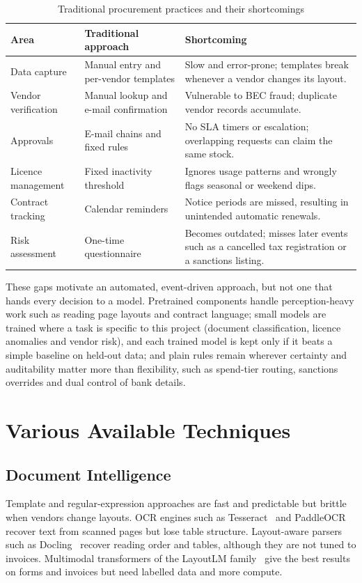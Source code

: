 \begin{table}[!htbp]
\centering\tablestyle
\caption{Traditional procurement practices and their shortcomings}\label{tab:traditional}
\begin{tabularx}{\textwidth}{|L{0.19\textwidth}|L{0.27\textwidth}|Y|}
\hline
\textbf{Area} & \textbf{Traditional approach} & \textbf{Shortcoming} \\ \hline
Data capture & Manual entry and per-vendor templates & Slow and error-prone; templates break whenever a vendor changes its layout. \\ \hline
Vendor verification & Manual lookup and e-mail confirmation & Vulnerable to BEC fraud; duplicate vendor records accumulate. \\ \hline
Approvals & E-mail chains and fixed rules & No SLA timers or escalation; overlapping requests can claim the same stock. \\ \hline
Licence management & Fixed inactivity threshold & Ignores usage patterns and wrongly flags seasonal or weekend dips. \\ \hline
Contract tracking & Calendar reminders & Notice periods are missed, resulting in unintended automatic renewals. \\ \hline
Risk assessment & One-time questionnaire & Becomes outdated; misses later events such as a cancelled tax registration or a sanctions listing. \\ \hline
\end{tabularx}
\end{table}

These gaps motivate an automated, event-driven approach, but not one that hands every decision to a model. Pretrained components handle perception-heavy work such as reading page layouts and contract language; small models are trained where a task is specific to this project (document classification, licence anomalies and vendor risk), and each trained model is kept only if it beats a simple baseline on held-out data; and plain rules remain wherever certainty and auditability matter more than flexibility, such as spend-tier routing, sanctions overrides and dual control of bank details.

\section{Various Available Techniques}

\subsection{Document Intelligence}
Template and regular-expression approaches are fast and predictable but brittle when vendors change layouts. OCR engines such as Tesseract~\cite{smith2007tesseract} and PaddleOCR~\cite{cui2025paddleocr} recover text from scanned pages but lose table structure. Layout-aware parsers such as Docling~\cite{auer2024docling} recover reading order and tables, although they are not tuned to invoices. Multimodal transformers of the LayoutLM family~\cite{xu2020layoutlm,huang2022layoutlmv3} give the best results on forms and invoices but need labelled data and more compute.

